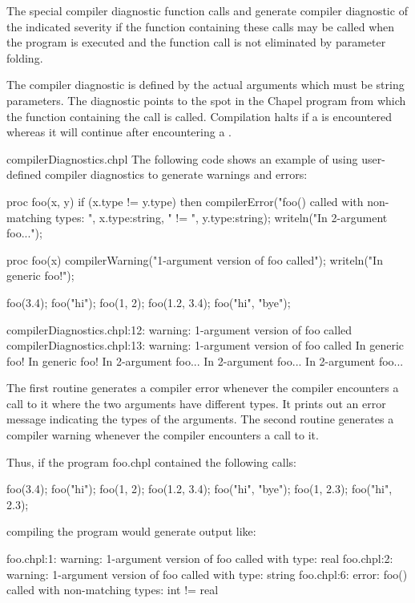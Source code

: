 The special compiler diagnostic function calls 
and  generate compiler diagnostic of the
indicated severity if the function containing these calls may be
called when the program is executed and the function call is not
eliminated by parameter folding.

The compiler diagnostic is defined by the actual arguments which must
be string parameters.  The diagnostic points to the spot in the Chapel
program from which the function containing the call is called.
Compilation halts if a  is encountered whereas it
will continue after encountering a .

\begin{chapelexample}{compilerDiagnostics.chpl}
The following code shows an example of using user-defined compiler
diagnostics to generate warnings and errors:
\begin{chapel}
proc foo(x, y) {
  if (x.type != y.type) then
    compilerError("foo() called with non-matching types: ",
                  x.type:string, " != ", y.type:string);
  writeln("In 2-argument foo...");
}

proc foo(x) {
  compilerWarning("1-argument version of foo called");
  writeln("In generic foo!");
}
\end{chapel}
\begin{chapelpost}
foo(3.4);
foo("hi");
foo(1, 2);
foo(1.2, 3.4);
foo("hi", "bye");
\end{chapelpost}
\begin{chapeloutput}
compilerDiagnostics.chpl:12: warning: 1-argument version of foo called
compilerDiagnostics.chpl:13: warning: 1-argument version of foo called
In generic foo!
In generic foo!
In 2-argument foo...
In 2-argument foo...
In 2-argument foo...
\end{chapeloutput}

The first routine generates a compiler error whenever the compiler
encounters a call to it where the two arguments have different types.
It prints out an error message indicating the types of the arguments.
The second routine generates a compiler warning whenever the compiler
encounters a call to it.

Thus, if the program foo.chpl contained the following calls:

\begin{numberedchapel}
foo(3.4);
foo("hi");
foo(1, 2);
foo(1.2, 3.4);
foo("hi", "bye");
foo(1, 2.3);
foo("hi", 2.3);
\end{numberedchapel}

\noindent compiling the program would generate output like:

\begin{commandline}
foo.chpl:1: warning: 1-argument version of foo called with type: real
foo.chpl:2: warning: 1-argument version of foo called with type: string
foo.chpl:6: error: foo() called with non-matching types: int != real
\end{commandline}

\end{chapelexample}

